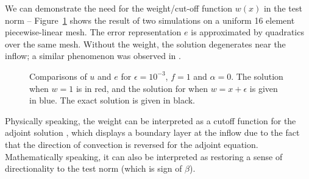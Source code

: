 We can demonstrate the need for the weight/cut-off function $w(x)$ in the test norm -- Figure~\ref{fig:comparison1D} shows the result of two simulations on a uniform 16 element piecewise-linear mesh. The error representation $e$ is approximated by quadratics over the same mesh.  Without the weight, the solution degenerates near the inflow; a similar phenomenon was observed in \cite{DahmenVariationalStabilization, DPG2, globalLocalDPG}.  
\begin{figure}[!h]
\centering
{}
\caption{Comparisons of $u$ and $e$ for $\epsilon = 10^{-3}$, $f=1$ and $\alpha = 0$. The solution when $w = 1$ is in red, and the solution for when $w = x+\epsilon$ is given in blue.  The exact solution is given in black.}
\label{fig:comparison1D}
\end{figure}

Physically speaking, the weight can be interpreted as a cutoff function for the adjoint solution \cite{DPGrobustness2}, which displays a boundary layer at the inflow due to the fact that the direction of convection is reversed for the adjoint equation.  Mathematically speaking, it can also be interpreted as restoring a sense of directionality to the test norm (which is  sign of $\beta$).  

